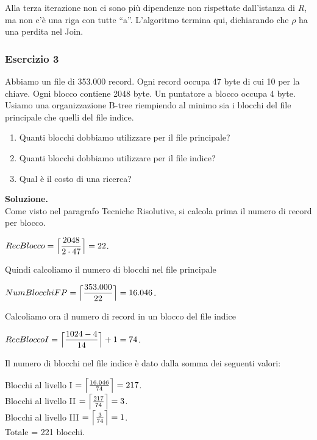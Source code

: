 Alla terza iterazione non ci sono più dipendenze non rispettate dall'istanza di $R$, ma non c'è una riga con tutte ``a''.
L'algoritmo termina qui, dichiarando che $\rho$ ha una perdita nel Join.
\subsubsection{Esercizio 3}
Abbiamo un file di 353.000 record. Ogni record occupa 47 byte di cui 10 per la chiave. Ogni blocco contiene 2048 byte. 
Un puntatore a blocco occupa 4 byte. Usiamo una organizzazione B-tree riempiendo al minimo sia i blocchi del file 
principale che quelli del file indice.

\begin{enumerate}
 \item Quanti blocchi dobbiamo utilizzare per il file principale? 
 \item Quanti blocchi dobbiamo utilizzare per il file indice?
 \item Qual è il costo di una ricerca?
\end{enumerate}

\noindent\textbf{\fontsize{14pt}{1em}Soluzione.}\\
Come visto nel paragrafo Tecniche Risolutive, si calcola prima il numero di record per blocco.
\begin{center}
 $RecBlocco = \Bigl\lceil \dfrac{2048}{2\cdot 47} \Bigr\rceil = 22$.\\
\end{center}
Quindi calcoliamo il numero di blocchi nel file principale
\begin{center}
 $NumBlocchiFP = \Bigl\lceil \dfrac{353.000}{22} \Bigr\rceil = 16.046$.\\
\end{center}
Calcoliamo ora il numero di record in un blocco del file indice
\begin{center}
 $RecBloccoI = \Bigl\lceil \dfrac{1024-4}{14} \Bigr\rceil + 1 = 74$.\\
\end{center}
Il numero di blocchi nel file indice è dato dalla somma dei seguenti valori:
\begin{center}
 Blocchi al livello I $= \Bigl\lceil \frac{16.046}{74} \Bigr\rceil = 217$.\\

 Blocchi al livello II $= \Bigl\lceil \frac{217}{74} \Bigr\rceil = 3$.\\

 Blocchi al livello III $= \Bigl\lceil \frac{3}{74} \Bigr\rceil = 1$.\\
 
 Totale = 221 blocchi.
\end{center}

